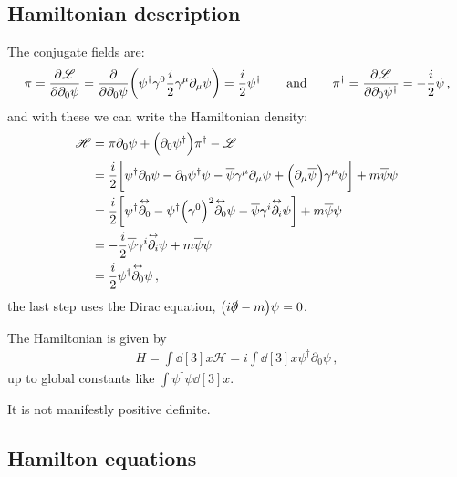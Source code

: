 \documentclass[main.tex]{subfiles}
\begin{document}
\subsection{Hamiltonian description}

The conjugate fields are: 
%
\begin{align}
\pi = \pdv{\mathscr{L}}{\partial_0 \psi } = \pdv{}{\partial_0 \psi} \qty(\psi ^\dag \gamma^{0} \frac{i}{2} \gamma^{\mu } \partial_{\mu } \psi )= 
\frac{i}{2} \psi ^\dag
\qquad \text{and} \qquad
\pi ^\dag = \pdv{\mathscr{L}}{\partial_0 \psi ^\dag} = - \frac{i}{2} \psi 
\,,
\end{align}
%
and with these we can write the Hamiltonian density: 
%
\begin{align}
\mathscr{H} &= \pi \partial_0 \psi + \qty(\partial_0 \psi ^\dag) \pi ^\dag - \mathscr{L}  \\
&= \frac{i}{2} \qty[ \psi ^\dag \partial_0 \psi - \partial_0 \psi ^\dag \psi - \overline{\psi} \gamma^{\mu } \partial_{\mu } \psi + \qty(\partial_{\mu } \overline{\psi})\gamma^{\mu } \psi ]
+m \overline{\psi} \psi   \\
&= \frac{i}{2} \qty[
\psi ^\dag \overset{\leftrightarrow}{\partial_0 } -
\psi ^\dag \qty(\gamma^{0})^2 \overset{\leftrightarrow}{\partial_0 }
\psi 
- \overline{\psi}  \gamma^{i}\overset{\leftrightarrow}{\partial_i }
\psi
]
+m \overline{\psi} \psi   \\
&= -\frac{i}{2} \overline{\psi}  \gamma^{i}\overset{\leftrightarrow}{\partial_i }
\psi
+ m \overline{\psi} \psi  \\
&= \frac{i}{2} \psi ^\dag \overset{\leftrightarrow}{\partial_0 } \psi 
\,,
\end{align}
%
the last step uses the Dirac equation, \(\qty(i \slashed{\partial} -m) \psi =0\).


The Hamiltonian is given by 
%
\begin{align}
H = \int \dd[3]{x} \mathscr{H} = i \int \dd[3]{x} \psi ^\dag \partial_0 \psi 
\,,
\end{align}
%
up to global constants like \(\int \psi ^\dag \psi \dd[3]{x}\). 

It is not manifestly positive definite. 

\subsection{Hamilton equations}
\end{document}
